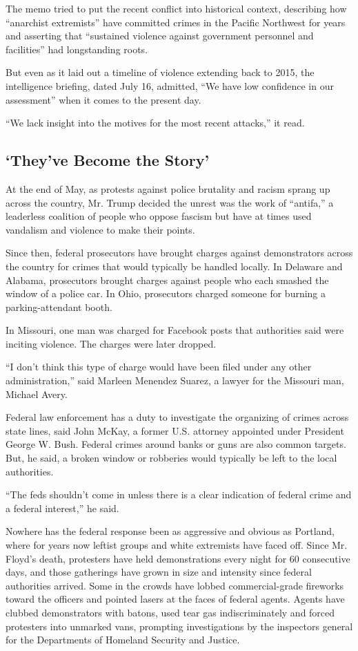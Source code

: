 The memo tried to put the recent conflict into historical context,
describing how ``anarchist extremists'' have committed crimes in the
Pacific Northwest for years and asserting that ``sustained violence
against government personnel and facilities'' had longstanding roots.

But even as it laid out a timeline of violence extending back to 2015,
the intelligence briefing, dated July 16, admitted, ``We have low
confidence in our assessment'' when it comes to the present day.

``We lack insight into the motives for the most recent attacks,'' it
read.

\hypertarget{theyve-become-the-story}{%
\subsection{`They've Become the Story'}\label{theyve-become-the-story}}

At the end of May, as protests against police brutality and racism
sprang up across the country, Mr. Trump decided the unrest was the work
of ``antifa,'' a leaderless coalition of people who oppose fascism but
have at times used vandalism and violence to make their points.

Since then, federal prosecutors have brought charges against
demonstrators across the country for crimes that would typically be
handled locally. In Delaware and Alabama, prosecutors brought charges
against people who each smashed the window of a police car. In Ohio,
prosecutors charged someone for burning a parking-attendant booth.

In Missouri, one man was charged for Facebook posts that authorities
said were inciting violence. The charges were later dropped.

``I don't think this type of charge would have been filed under any
other administration,'' said Marleen Menendez Suarez, a lawyer for the
Missouri man, Michael Avery.

Federal law enforcement has a duty to investigate the organizing of
crimes across state lines, said John McKay, a former U.S. attorney
appointed under President George W. Bush. Federal crimes around banks or
guns are also common targets. But, he said, a broken window or robberies
would typically be left to the local authorities.

``The feds shouldn't come in unless there is a clear indication of
federal crime and a federal interest,'' he said.

Nowhere has the federal response been as aggressive and obvious as
Portland, where for years now leftist groups and white extremists have
faced off. Since Mr. Floyd's death, protesters have held demonstrations
every night for 60 consecutive days, and those gatherings have grown in
size and intensity since federal authorities arrived. Some in the crowds
have lobbed commercial-grade fireworks toward the officers and pointed
lasers at the faces of federal agents. Agents have clubbed demonstrators
with batons, used tear gas indiscriminately and forced protesters into
unmarked vans, prompting investigations by the inspectors general for
the Departments of Homeland Security and Justice.

